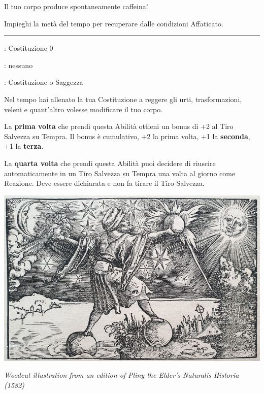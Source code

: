 \begin{multicols}{2}
Il tuo corpo produce spontaneamente caffeina!

Impieghi la metà del tempo per recuperare dalle condizioni Affaticato.

\smallskip\noindent\rule{\linewidth}{2pt} \hypertarget{Resistenza della pietra}{}\medskip{}
\noindent
\begin{description}[noitemsep, topsep=0pt, parsep=0pt, partopsep=0pt, leftmargin=0cm, labelwidth=2.5cm]
    \item[\textbf{Requisito}]: Costituzione 0
    \item[\textbf{Tiri Salvezza}]: nessuno
    \item[\textbf{Caratteristica}]: Costituzione o Saggezza
\end{description}

Nel tempo hai allenato la tua Costituzione a reggere gli urti, trasformazioni, veleni e quant'altro volesse modificare il tuo corpo.

La \textbf{prima volta} che prendi questa Abilità ottieni un bonus di +2 al Tiro Salvezza su Tempra. Il bonus è cumulativo, +2 la prima volta, +1 la \textbf{seconda}, +1 la \textbf{terza}.

La \textbf{quarta volta} che prendi questa Abilità puoi decidere di riuscire automaticamente in un Tiro Salvezza su Tempra una volta al giorno come Reazione. Deve essere dichiarata e non fa tirare il Tiro Salvezza.


\begin{center}
	\includegraphics[width=0.9\linewidth]{immagini/Historia_Mundi_Naturalis.png}

	\emph{Woodcut illustration from an edition of Pliny the Elder's Naturalis Historia (1582)}
\end{center}


\end{multicols}
